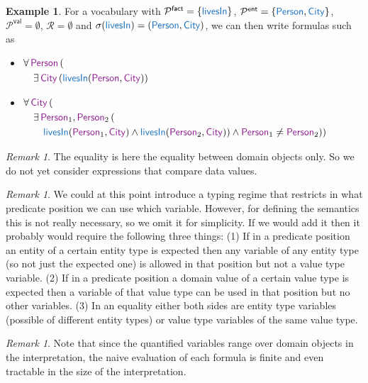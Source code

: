\documentclass[11pt]{amsart}
\theoremstyle{definition}
\newtheorem{example}{Example}
\theoremstyle{remark}
\newtheorem{remark}[theorem]{Remark}
\newcommand{\Preds}{\mathcal{P}}
\newcommand{\EntPreds}{\Preds^{\textsf{ent}}}
\newcommand{\ValPreds}{\Preds^{\textsf{val}}}
\newcommand{\FactPreds}{\Preds^{\textsf{fact}}}
\newcommand{\RefSchemes}{\mathcal{R}}
\newcommand{\pr}[1]{\mathsf{\textcolor{RoyalBlue}{#1}}}
\newcommand{\var}[1]{\mathsf{\textcolor{Plum}{#1}}}
\begin{document}
\begin{example}
For a vocabulary with $\FactPreds = \{ \pr{livesIn}  \}$, $\EntPreds = \{ \pr{Person}, \pr{City} \}$, $\ValPreds = \emptyset$, $\RefSchemes = \emptyset$ and $\sigma(\pr{livesIn}) = (\pr{Person}, \pr{City})$, we can then write formulas such as
\begin{itemize}
  \item $\begin{aligned}[t]
    & \forall \, \var{Person} \, ( \\
    & \quad \exists \, \var{City} \, (\pr{livesIn}(\var{Person}, \var{City}))
    \end{aligned}$
  \item $\begin{aligned}[t] 
    & \forall \, \var{City} \, ( \\
    & \quad \exists \, \var{Person}_1, \var{Person}_2 \, ( \\
    & \quad \quad \pr{livesIn}(\var{Person}_1, \var{City}) \wedge \pr{livesIn}(\var{Person}_2, \var{City})) \wedge \var{Person}_1 \neq \var{Person}_2))
    \end{aligned}$
\end{itemize}
\end{example}

\begin{remark}
The equality is here the equality between domain objects only. So we do not yet consider expressions that compare data values.
\end{remark}

\begin{remark}
We could at this point introduce a typing regime that restricts in what predicate position we can use which variable. However, for defining the semantics this is not really necessary, so we omit it for simplicity. If we would add it then it probably would require the following three things: (1) If in a predicate position an entity of a certain entity type is expected then any variable of any entity type (so not just the expected one) is allowed in that position but not a value type variable. (2) If in a predicate position a domain value of a certain value type is expected then a variable of that value type can be used in that position but no other variables. (3) In an equality either both sides are entity type variables (possible of different entity types) or value type variables of the same value type.
\end{remark}

\begin{remark}
Note that since the quantified variables range over domain objects in the interpretation, the naive evaluation of each formula is finite and even tractable in the size of the interpretation. 
\end{remark}
\end{document}
